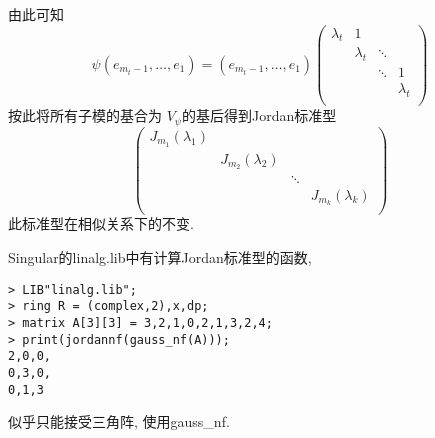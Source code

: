 \documentclass[12pt, a4paper,oneside, UTF8]{ctexart}
\theoremstyle{definition}
\theoremstyle{plain}
\begin{document}
由此可知
\[
\psi(e_{m_{t}-1}, \ldots ,e_{1})=(e_{m_{t}-1}, \ldots ,e_{1})\begin{pmatrix} \lambda_{t} & 1 &  &  \\  & \lambda_{t} & \ddots &  \\  &  &  \ddots&  1\\  &  &  & \lambda_{t} \\\end{pmatrix}
\]
按此将所有子模的基合为 $V_{\psi}$的基后得到Jordan标准型
\[
\begin{pmatrix} J_{m_1}(\lambda_1) &  &  &  \\  &  J_{m_2}(\lambda_2)&  &  \\  &  & \ddots &  \\  &  &  &  J_{m_k}(\lambda_k)\\\end{pmatrix}
\]
此标准型在相似关系下的不变.
\newpage



Singular的linalg.lib中有计算Jordan标准型的函数,

\begin{lstlisting}
> LIB"linalg.lib";
> ring R = (complex,2),x,dp;
> matrix A[3][3] = 3,2,1,0,2,1,3,2,4;
> print(jordannf(gauss_nf(A)));
2,0,0,
0,3,0,
0,1,3
\end{lstlisting}

似乎只能接受三角阵, 使用gauss\_nf.
\end{document}
